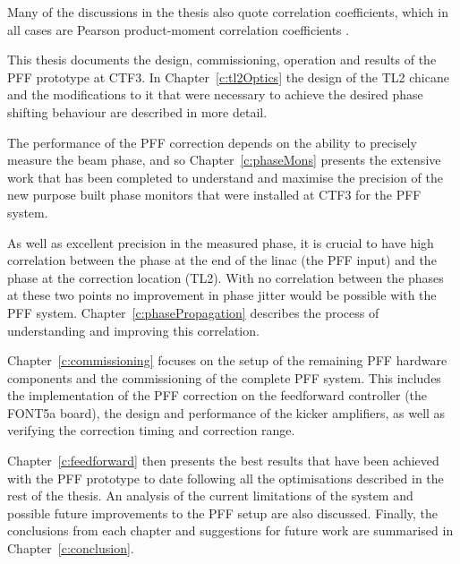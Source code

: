 Many of the discussions in the thesis also quote correlation coefficients, which in all cases are Pearson product-moment correlation coefficients \cite{corrCoeff}.


This thesis documents the design, commissioning, operation and results of the PFF prototype at CTF3. In Chapter~\ref{c:tl2Optics} the design of the TL2 chicane and the modifications to it that were necessary to achieve the desired phase shifting behaviour are described in more detail. 

The performance of the PFF correction depends on the ability to precisely measure the beam phase, and so Chapter~\ref{c:phaseMons} presents the extensive work that has been completed to understand and maximise the precision of the new purpose built phase monitors that were installed at CTF3 for the PFF system. 

As well as excellent precision in the measured phase, it is crucial to have high correlation between the phase at the end of the linac (the PFF input) and the phase at the correction location (TL2). With no correlation between the phases at these two points no improvement in phase jitter would be possible with the PFF system. Chapter~\ref{c:phasePropagation} describes the process of understanding and improving this correlation.

Chapter~\ref{c:commissioning} focuses on the setup of the remaining PFF hardware components and the commissioning of the complete PFF system. This includes the implementation of the PFF correction on the feedforward controller (the FONT5a board), the design and performance of the kicker amplifiers, as well as verifying the correction timing and correction range.

Chapter~\ref{c:feedforward} then presents the best results that have been achieved with the PFF prototype to date following all the optimisations described in the rest of the thesis. An analysis of the current limitations of the system and possible future improvements to the PFF setup are also discussed. Finally, the conclusions from each chapter and suggestions for future work are summarised in Chapter~\ref{c:conclusion}.

